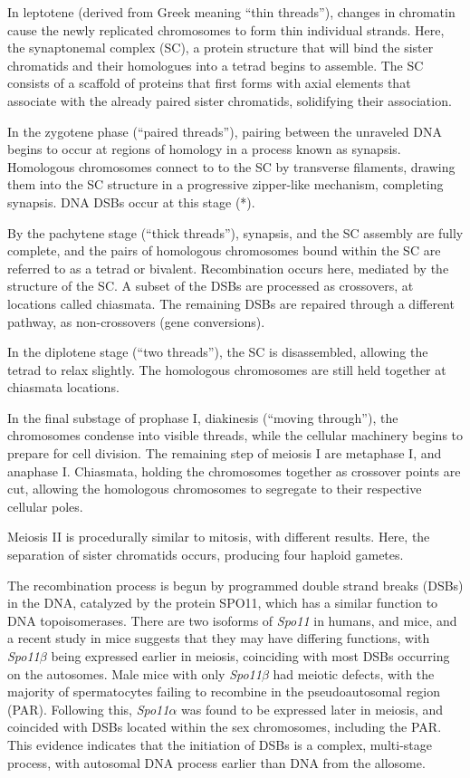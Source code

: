 In leptotene (derived from Greek meaning ``thin threads''), changes in chromatin cause the newly replicated chromosomes to form thin individual strands.
Here, the synaptonemal complex (SC), a protein structure that will bind the sister chromatids and their homologues into a tetrad begins to assemble.
The SC consists of a scaffold of proteins that first forms with axial elements that associate with the already paired sister chromatids, solidifying their association.

In the zygotene phase (``paired threads''), pairing between the unraveled DNA begins to occur at regions of homology in a process known as synapsis.
Homologous chromosomes connect to to the SC by transverse filaments, drawing them into the SC structure in a progressive zipper-like mechanism, completing synapsis\cite{Yang2009}.
DNA DSBs occur at this stage (*).

By the pachytene stage (``thick threads''), synapsis, and the SC assembly are fully complete, and the pairs of homologous chromosomes bound within the SC are referred to as a tetrad or bivalent.
Recombination occurs here, mediated by the structure of the SC.
A subset of the DSBs are processed as crossovers, at locations called chiasmata.
The remaining DSBs are repaired through a different pathway, as non-crossovers (gene conversions).

In the diplotene stage (``two threads''), the SC is disassembled, allowing the tetrad to relax slightly.
The homologous chromosomes are still held together at chiasmata locations.

In the final substage of prophase I, diakinesis (``moving through''), the chromosomes condense into visible threads, while the cellular machinery begins to prepare for cell division.
The remaining step of meiosis I are metaphase I, and anaphase I.
Chiasmata, holding the chromosomes together as crossover points are cut, allowing the homologous chromosomes to segregate to their respective cellular poles.

Meiosis II is procedurally similar to mitosis, with different results.
Here, the separation of sister chromatids occurs, producing four haploid gametes.




The recombination process is begun by programmed double strand breaks (DSBs) in the DNA, catalyzed by the protein SPO11, which has a similar function to DNA topoisomerases\cite{DeMassy2013}.
There are two isoforms of \textit{Spo11} in humans, and mice, and a recent study in mice suggests that they may have differing functions, with \textit{Spo11$\beta$} being expressed earlier in meiosis, coinciding with most DSBs occurring on the autosomes.
Male mice with only \textit{Spo11$\beta$} had meiotic defects, with the majority of spermatocytes failing to recombine in the pseudoautosomal region (PAR).
Following this, \textit{Spo11$\alpha$} was found to be expressed later in meiosis, and coincided with DSBs located within the sex chromosomes, including the PAR\cite{Kauppi2011,DeMassy2013}.
This evidence indicates that the initiation of DSBs is a complex, multi-stage process, with autosomal DNA process earlier than DNA from the allosome.





